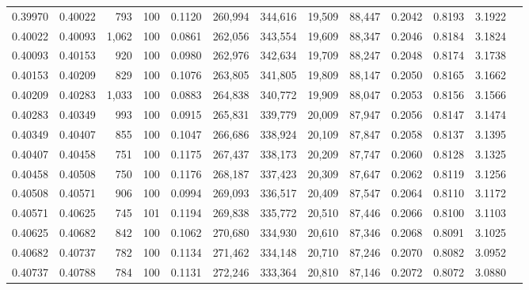 \begin{tabular}{rrrrrrrrrrrrr}
0.39970 & 0.40022 &   793 & 100 &                                     0.1120 & 260,994 & 344,616 &  19,509 &  88,447 & 0.2042 & 0.8193 & 3.1922 \\
0.40022 & 0.40093 & 1,062 & 100 &                                     0.0861 & 262,056 & 343,554 &  19,609 &  88,347 & 0.2046 & 0.8184 & 3.1824 \\
0.40093 & 0.40153 &   920 & 100 &                                     0.0980 & 262,976 & 342,634 &  19,709 &  88,247 & 0.2048 & 0.8174 & 3.1738 \\
0.40153 & 0.40209 &   829 & 100 &                                     0.1076 & 263,805 & 341,805 &  19,809 &  88,147 & 0.2050 & 0.8165 & 3.1662 \\
0.40209 & 0.40283 & 1,033 & 100 &                                     0.0883 & 264,838 & 340,772 &  19,909 &  88,047 & 0.2053 & 0.8156 & 3.1566 \\
0.40283 & 0.40349 &   993 & 100 &                                     0.0915 & 265,831 & 339,779 &  20,009 &  87,947 & 0.2056 & 0.8147 & 3.1474 \\
0.40349 & 0.40407 &   855 & 100 &                                     0.1047 & 266,686 & 338,924 &  20,109 &  87,847 & 0.2058 & 0.8137 & 3.1395 \\
0.40407 & 0.40458 &   751 & 100 &                                     0.1175 & 267,437 & 338,173 &  20,209 &  87,747 & 0.2060 & 0.8128 & 3.1325 \\
0.40458 & 0.40508 &   750 & 100 &                                     0.1176 & 268,187 & 337,423 &  20,309 &  87,647 & 0.2062 & 0.8119 & 3.1256 \\
0.40508 & 0.40571 &   906 & 100 &                                     0.0994 & 269,093 & 336,517 &  20,409 &  87,547 & 0.2064 & 0.8110 & 3.1172 \\
0.40571 & 0.40625 &   745 & 101 &                                     0.1194 & 269,838 & 335,772 &  20,510 &  87,446 & 0.2066 & 0.8100 & 3.1103 \\
0.40625 & 0.40682 &   842 & 100 &                                     0.1062 & 270,680 & 334,930 &  20,610 &  87,346 & 0.2068 & 0.8091 & 3.1025 \\
0.40682 & 0.40737 &   782 & 100 &                                     0.1134 & 271,462 & 334,148 &  20,710 &  87,246 & 0.2070 & 0.8082 & 3.0952 \\
0.40737 & 0.40788 &   784 & 100 &                                     0.1131 & 272,246 & 333,364 &  20,810 &  87,146 & 0.2072 & 0.8072 & 3.0880 \\

\end{tabular}
